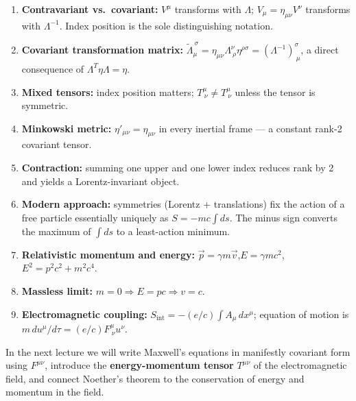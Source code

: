 \begin{enumerate}
    \item \textbf{Contravariant vs.\ covariant:} $V^\mu$ transforms with
      $\Lambda$; $V_\mu = \eta_{\mu\nu}V^\nu$ transforms with $\Lambda^{-1}$.
      Index position is the sole distinguishing notation.
    \item \textbf{Covariant transformation matrix:}
      $\tilde\Lambda_\mu^{\ \sigma} = \eta_{\mu\nu}\Lambda^\nu_{\ \rho}\eta^{\rho\sigma}
      = (\Lambda^{-1})^\sigma_{\ \mu}$, a direct consequence of
      $\Lambda^T\eta\Lambda = \eta$.
    \item \textbf{Mixed tensors:} index position matters;
      $T^\mu_{\ \nu} \neq T_{\ \nu}^\mu$ unless the tensor is symmetric.
    \item \textbf{Minkowski metric:} $\eta'_{\mu\nu} = \eta_{\mu\nu}$ in
      every inertial frame — a constant rank-2 covariant tensor.
    \item \textbf{Contraction:} summing one upper and one lower index reduces
      rank by 2 and yields a Lorentz-invariant object.
    \item \textbf{Modern approach:} symmetries (Lorentz + translations) fix
      the action of a free particle essentially uniquely as $S=-mc\int ds$.
      The minus sign converts the maximum of $\int ds$ to a least-action minimum.
    \item \textbf{Relativistic momentum and energy:}
      $\vec{p} = \gamma m\vec{v}$,\quad $E = \gamma mc^2$,\quad
      $E^2 = p^2c^2 + m^2c^4$.
    \item \textbf{Massless limit:} $m = 0 \Rightarrow E = pc \Rightarrow v = c$.
    \item \textbf{Electromagnetic coupling:}
      $S_{\mathrm{int}} = -(e/c)\!\int\!A_\mu\,dx^\mu$; equation of motion is
      $m\,du^\mu/d\tau = (e/c)F^{\mu}_{\ \nu}u^\nu$.
\end{enumerate}

In the next lecture we will write Maxwell's equations in manifestly covariant
form using $F^{\mu\nu}$, introduce the \textbf{energy-momentum tensor}
$T^{\mu\nu}$ of the electromagnetic field, and connect Noether's theorem to
the conservation of energy and momentum in the field.
